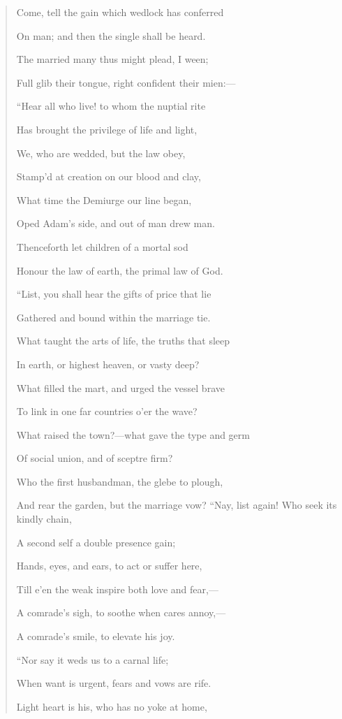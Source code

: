 \begin{quote}
Come, tell the gain which wedlock has conferred 

On man; and then the single shall be heard.

The married many thus might plead, I ween;

Full glib their tongue, right confident their mien:—

``Hear all who live! to whom the nuptial rite

Has brought the privilege of life and light,

We, who are wedded, but the law obey,

Stamp'd at creation on our blood and clay,

What time the Demiurge our line began,

Oped Adam's side, and out of man drew man.

Thenceforth let children of a mortal sod

Honour the law of earth, the primal law of God.

``List, you shall hear the gifts of price
that lie

Gathered and bound within the marriage tie.

What taught the arts of life, the truths that sleep

In earth, or highest heaven, or vasty deep?

What filled the mart, and urged the vessel brave

To link in one far countries o'er the wave?

What raised the town?—what gave the type and germ

Of social union, and of sceptre firm?

Who the first husbandman, the glebe to plough,

And rear the garden, but the marriage vow?
``Nay, list again! Who seek its kindly
chain,

A second self a double presence gain;

Hands, eyes, and ears, to act or suffer here,

Till e'en the weak inspire both love and fear,—

A comrade's sigh, to soothe when cares annoy,—

A comrade's smile, to elevate his joy.

``Nor say it weds us to a carnal
life;

When want is urgent, fears and vows are rife.

Light heart is his, who has no yoke at home,


\end{quote}
